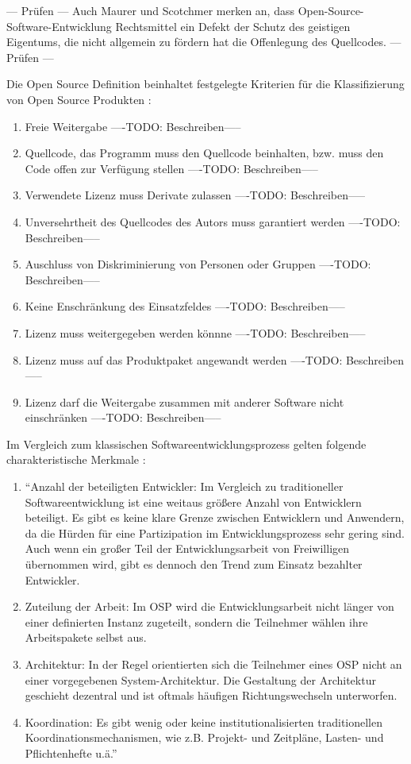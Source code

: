 --- Prüfen ---
Auch Maurer und Scotchmer merken an, dass Open-Source-Software-Entwicklung Rechtsmittel ein Defekt der Schutz des geistigen Eigentums, die nicht allgemein zu fördern hat die Offenlegung des Quellcodes. 
--- Prüfen ---

Die Open Source Definition beinhaltet festgelegte Kriterien für die Klassifizierung von Open Source Produkten \cite{suchen}:
\begin{enumerate}
\item Freie Weitergabe
----TODO: Beschreiben-----
\item Quellcode, das Programm muss den Quellcode beinhalten, bzw. muss den Code offen zur Verfügung stellen
----TODO: Beschreiben-----
\item Verwendete Lizenz muss Derivate zulassen
----TODO: Beschreiben-----
\item Unversehrtheit des Quellcodes des Autors muss garantiert werden
----TODO: Beschreiben-----
\item Auschluss von Diskriminierung von Personen oder Gruppen
----TODO: Beschreiben-----
\item Keine Enschränkung des Einsatzfeldes
----TODO: Beschreiben-----
\item Lizenz muss weitergegeben werden könnne
----TODO: Beschreiben-----
\item Lizenz muss auf das Produktpaket angewandt werden
----TODO: Beschreiben-----
\item Lizenz darf die Weitergabe zusammen mit anderer Software nicht einschränken
----TODO: Beschreiben-----
\end{enumerate}

Im Vergleich zum klassischen Softwareentwicklungsprozess gelten folgende charakteristische Merkmale \cite{suchen}:
\begin{enumerate}
\item “Anzahl der beteiligten Entwickler: Im Vergleich zu traditioneller Softwareentwicklung ist eine weitaus größere Anzahl von Entwicklern beteiligt. Es gibt es keine klare Grenze zwischen Entwicklern und Anwendern, da die Hürden für eine Partizipation im Entwicklungsprozess sehr gering sind. Auch wenn ein großer Teil der Entwicklungsarbeit von Freiwilligen übernommen wird, gibt es dennoch den Trend zum Einsatz bezahlter Entwickler.
\item Zuteilung der Arbeit: Im OSP wird die Entwicklungsarbeit nicht länger von einer definierten Instanz zugeteilt, sondern die Teilnehmer wählen ihre Arbeitspakete selbst aus.
\item Architektur: In der Regel orientierten sich die Teilnehmer eines OSP nicht an einer vorgegebenen System-Architektur. Die Gestaltung der Architektur geschieht dezentral und ist oftmals häufigen Richtungswechseln unterworfen.
\item Koordination: Es gibt wenig oder keine institutionalisierten traditionellen Koordinationsmechanismen, wie z.B. Projekt- und Zeitpläne, Lasten- und Pflichtenhefte u.ä.” \cite{suchen}
\end{enumerate}

